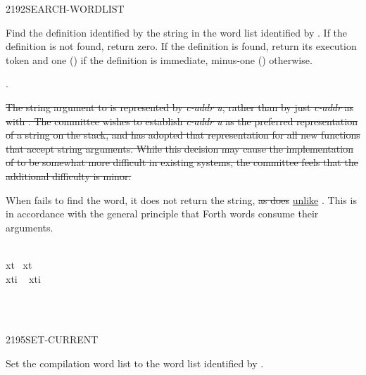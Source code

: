 \begin{worddef}{2192}{SEARCH-WORDLIST}
\item {}

	Find the definition identified by the string  in
	the word list identified by . If the definition is not
	found, return zero. If the definition is found, return its
	execution token  and one () if the definition is
	immediate, minus-one () otherwise.

\see {}.

	\begin{rationale} %
\cbstart{}\sout{%
		The string argument to  is represented
		by \emph{c-addr u}, rather than by just \emph{c-addr} as
		with . The committee wishes to establish
		\emph{c-addr u} as the preferred representation of a string
		on the stack, and has adopted that representation for all new
		functions that accept string arguments. While this decision
		may cause the implementation of  to be
		somewhat more difficult in existing systems, the committee
		feels that the additional difficulty is minor.}

		When  fails to find the word, it does
		not return the string, \sout{as does} \uline{unlike} . This is in
		accordance with the general principle that Forth words consume
		their arguments.
\cbend
	\end{rationale}

	\begin{testing}\ttfamily
		   \\
		 xt~   xt~ \word{!} \\
		 xti  ~ xti \word{!}  

		 \\
		 \\
	\end{testing}
\end{worddef}


\begin{worddef}{2195}{SET-CURRENT}
\item {}

	Set the compilation word list to the word list identified by
	.

	\begin{testing}

		 \\
		 \\

	\end{testing}
\end{worddef}


